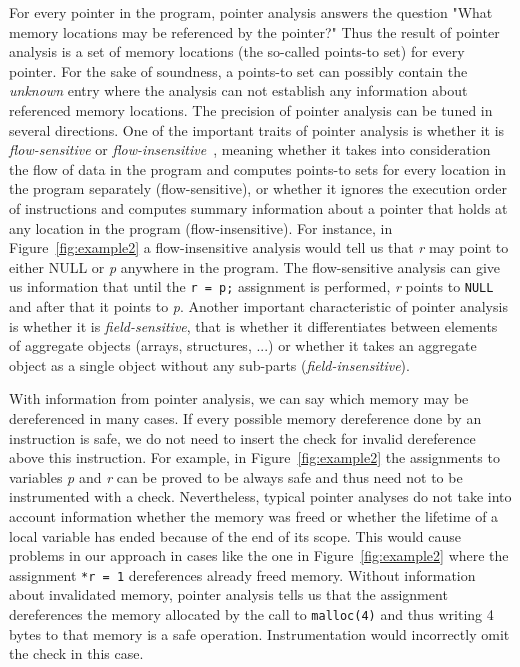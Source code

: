 For every pointer in the program, pointer analysis answers the
question "What memory locations may be referenced by the pointer?"
Thus the result of pointer analysis is a set of memory locations (the
so-called points-to set) for every pointer. For the sake of
soundness, a points-to set can possibly contain the \emph{unknown}
entry where the analysis can not establish any information about
referenced memory locations. The precision of pointer analysis can be
tuned in several directions. One of the important traits of pointer
analysis is whether it is \emph{flow-sensitive} or
\emph{flow-insensitive}~\cite{Hind01}, meaning whether it takes into
consideration the flow of data in the program and computes points-to
sets for every location in the program separately (flow-sensitive), or
whether it ignores the execution order of instructions and computes
summary information about a pointer that holds at any location in the
program (flow-insensitive). For instance, in
Figure~\ref{fig:example2} a flow-insensitive analysis would tell us
that \emph{r} may point to either NULL or \emph{p} anywhere in the
program. The flow-sensitive analysis can give us information that
until the \texttt{r = p;} assignment is performed, \emph{r} points to
\texttt{NULL} and after that it points to \emph{p}. Another important
characteristic of pointer analysis is whether it is
\emph{field-sensitive}, that is whether it differentiates between
elements of aggregate objects (arrays, structures, ...) or whether it
takes an aggregate object as a single object without any sub-parts
(\emph{field-insensitive}).

With information from pointer analysis, we can say which memory may be
dereferenced in many cases. If every possible memory dereference done
by an instruction is safe, we do not need to insert the check for
invalid dereference above this instruction. For example, in
Figure~\ref{fig:example2} the assignments to variables \emph{p} and
\emph{r} can be proved to be always safe and thus need not to be
instrumented with a check. Nevertheless, typical pointer analyses do
not take into account information whether the memory was freed or
whether the lifetime of a local variable has ended because of the end
of its scope.  This would cause problems in our approach in cases like
the one in Figure~\ref{fig:example2} where the assignment \texttt{*r =
  1} dereferences already freed memory.  Without information about
invalidated memory, pointer analysis tells us that the assignment
dereferences the memory allocated by the call to \texttt{malloc(4)}
and thus writing 4 bytes to that memory is a safe operation.
Instrumentation would incorrectly omit the check in this case.

